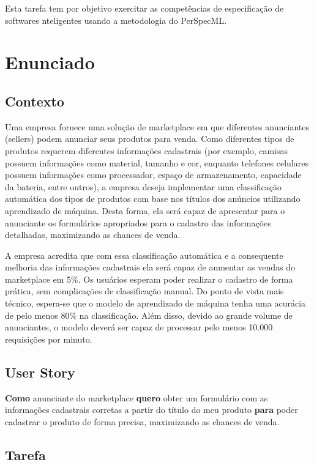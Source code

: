 \documentclass[10pt, a4paper]{article}
\begin{document}
Esta tarefa tem por objetivo exercitar as competências de especificação de softwares nteligentes usando a metodologia do PerSpecML.

\section{Enunciado}

\subsection{Contexto}

Uma empresa fornece uma solução de marketplace em que diferentes anunciantes (sellers) podem anunciar seus produtos para venda. Como diferentes tipos de 
produtos requerem diferentes informações cadastrais (por exemplo, camisas possuem informações como material, tamanho e cor, enquanto telefones celulares possuem 
informações como processador, espaço de armazenamento, capacidade da bateria, entre outros), a empresa deseja implementar uma classificação automática dos tipos 
de produtos com base nos títulos dos anúncios utilizando aprendizado de máquina. Desta forma, ela será capaz de apresentar para o anunciante os formulários 
apropriados para o cadastro das informações detalhadas, maximizando as chances de venda.

A empresa acredita que com essa classificação automática e a consequente melhoria das informações cadastrais ela será capaz de aumentar as vendas do marketplace em 
5\%. Os usuários esperam poder realizar o cadastro de forma prática, sem complicações de classificação manual. Do ponto de vista mais técnico, espera-se que o 
modelo de aprendizado de máquina tenha uma acurácia de pelo menos 80\% na classificação. Além disso, devido ao grande volume de anunciantes, o modelo deverá ser 
capaz de processar pelo menos 10.000 requisições por minuto.

\subsection{User Story}

\textbf{Como} anunciante do marketplace \textbf{quero} obter um formulário com as informações cadastrais corretas a partir do título do meu produto 
\textbf{para} poder cadastrar o produto de forma precisa, maximizando as chances de venda.

\subsection{Tarefa}
\end{document}
